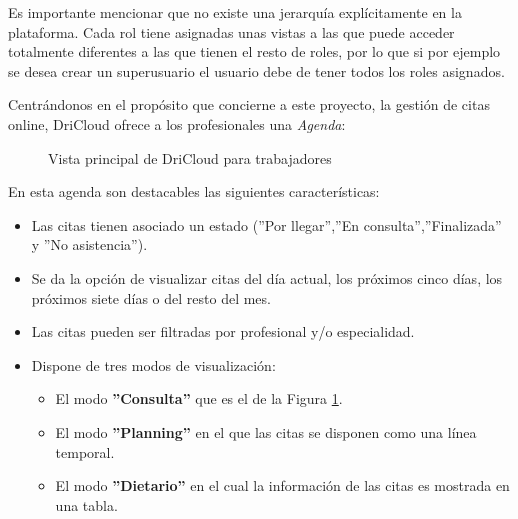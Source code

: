 Es importante mencionar que no existe una jerarquía explícitamente en la plataforma. Cada rol tiene asignadas unas vistas a las que puede acceder totalmente diferentes a las que tienen el resto de roles, por lo que si por ejemplo se desea crear un superusuario el usuario debe de tener todos los roles asignados. \bigskip

Centrándonos en el propósito que concierne a este proyecto, la gestión de citas online, DriCloud ofrece a los profesionales una \textit{Agenda}: 

\begin{figure}[H]
    \caption{Vista principal de DriCloud para trabajadores}
    \label{fig:dricloud-principal}
\end{figure}

En esta agenda son destacables las siguientes características:

\begin{itemize}
    \item Las citas tienen asociado un estado (''Por llegar'',''En consulta'',''Finalizada'' y ''No asistencia'').
    \item Se da la opción de visualizar citas del día actual, los próximos cinco días, los próximos siete días o del resto del mes.
    \item Las citas pueden ser filtradas por profesional y/o especialidad.
    \item Dispone de tres modos de visualización:
    \begin{itemize}
        \item El modo \textbf{''Consulta''} que es el de la Figura \ref{fig:dricloud-principal}.
        \item El modo \textbf{''Planning''} en el que las citas se disponen como una línea temporal.
        \item El modo \textbf{''Dietario''} en el cual la información de las citas es mostrada en una tabla.
    \end{itemize}
\end{itemize}


